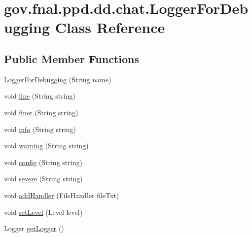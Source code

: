 \hypertarget{classgov_1_1fnal_1_1ppd_1_1dd_1_1chat_1_1LoggerForDebugging}{\section{gov.\-fnal.\-ppd.\-dd.\-chat.\-Logger\-For\-Debugging Class Reference}
\label{classgov_1_1fnal_1_1ppd_1_1dd_1_1chat_1_1LoggerForDebugging}
}
\subsection*{Public Member Functions}
\begin{DoxyCompactItemize}
\item 
\hyperlink{classgov_1_1fnal_1_1ppd_1_1dd_1_1chat_1_1LoggerForDebugging_aba29d29fdc9809d0f573234248659faa}{Logger\-For\-Debugging} (String name)
\item 
void \hyperlink{classgov_1_1fnal_1_1ppd_1_1dd_1_1chat_1_1LoggerForDebugging_a463354c7650543e5a0b2f6806d2dbf81}{fine} (String string)
\item 
void \hyperlink{classgov_1_1fnal_1_1ppd_1_1dd_1_1chat_1_1LoggerForDebugging_a1b66d6b72f6e8cad27222b266b51ca0f}{finer} (String string)
\item 
void \hyperlink{classgov_1_1fnal_1_1ppd_1_1dd_1_1chat_1_1LoggerForDebugging_a6bd08b6b833b8a2098aea0a2281366da}{info} (String string)
\item 
void \hyperlink{classgov_1_1fnal_1_1ppd_1_1dd_1_1chat_1_1LoggerForDebugging_a9ab4c88d4d21fbbb6989697e4bf19cc5}{warning} (String string)
\item 
void \hyperlink{classgov_1_1fnal_1_1ppd_1_1dd_1_1chat_1_1LoggerForDebugging_ac35f1a7866c1e9d6b59c8b679b90f81f}{config} (String string)
\item 
void \hyperlink{classgov_1_1fnal_1_1ppd_1_1dd_1_1chat_1_1LoggerForDebugging_a3571e36c20e290cd81fcee8442be0431}{severe} (String string)
\item 
void \hyperlink{classgov_1_1fnal_1_1ppd_1_1dd_1_1chat_1_1LoggerForDebugging_a85327b875e4232191aa71782daee5fb3}{add\-Handler} (File\-Handler file\-Txt)
\item 
void \hyperlink{classgov_1_1fnal_1_1ppd_1_1dd_1_1chat_1_1LoggerForDebugging_afa1df09f05cefed4e672ec474f23ed35}{set\-Level} (Level level)
\item 
Logger \hyperlink{classgov_1_1fnal_1_1ppd_1_1dd_1_1chat_1_1LoggerForDebugging_a2d1f413fb8fda0b558935ee6734cf1c5}{get\-Logger} ()
\end{DoxyCompactItemize}


